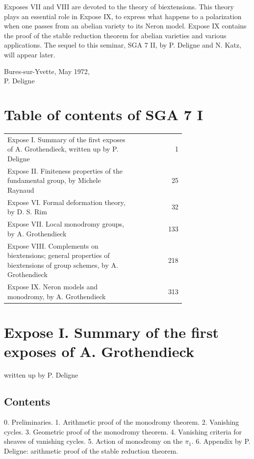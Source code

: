 \documentclass[11pt]{article}
\begin{document}
Exposes VII and VIII are devoted to the theory of biextensions. This theory plays an essential role in Expose IX, to express what happens to a polarization when one passes from an abelian variety to its Neron model. Expose IX contains the proof of the stable reduction theorem for abelian varieties and various applications. The sequel to this seminar, SGA 7 II, by P. Deligne and N. Katz, will appear later.

\begin{flushright}
Bures-sur-Yvette, May 1972,\\
P. Deligne
\end{flushright}

\section*{Table of contents of SGA 7 I}
\begin{longtable}{@{}p{0.72\linewidth}r@{}}
Expose I. Summary of the first exposes of A. Grothendieck, written up by P. Deligne & 1\\
Expose II. Finiteness properties of the fundamental group, by Michele Raynaud & 25\\
Expose VI. Formal deformation theory, by D. S. Rim & 32\\
Expose VII. Local monodromy groups, by A. Grothendieck & 133\\
Expose VIII. Complements on biextensions; general properties of biextensions of group schemes, by A. Grothendieck & 218\\
Expose IX. Neron models and monodromy, by A. Grothendieck & 313
\end{longtable}

\section*{Expose I. Summary of the first exposes of A. Grothendieck}
\begin{center}
written up by P. Deligne
\end{center}

\subsection*{Contents}
0. Preliminaries. 1. Arithmetic proof of the monodromy theorem. 2. Vanishing cycles. 3. Geometric proof of the monodromy theorem. 4. Vanishing criteria for sheaves of vanishing cycles. 5. Action of monodromy on the $\pi_1$. 6. Appendix by P. Deligne: arithmetic proof of the stable reduction theorem.
\end{document}
